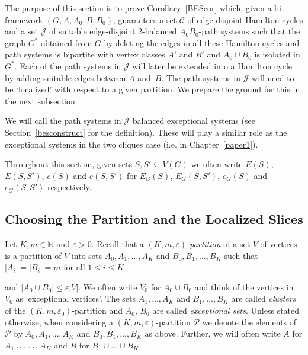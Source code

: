 \documentclass{memo-l}
\def\COMMENT#1{}
\def\cC{\mathcal{C}}
\def\eps{\varepsilon}
\def\cJ{\mathcal{J}}
\numberwithin{section}{chapter}
\numberwithin{equation}{section}
\numberwithin{firstthm}{section}
\numberwithin{figure}{section}
\begin{document}
{The purpose of this section is to prove Corollary~\ref{BEScor} which, given a bi-framework $(G,A,A_0,B,B_0)$,
guarantees a set $\cC$ of edge-disjoint Hamilton cycles and a set $\cJ$ of suitable edge-disjoint
$2$-balanced $A_0B_0$-path systems such that the graph $G^*$ obtained from $G$ by deleting the edges in
all these Hamilton cycles and path systems is bipartite with vertex classes $A'$ and $B'$ and
$A_0\cup B_0$ is isolated in $G^*$. Each of the path systems in $\cJ$ will later be extended into
a Hamilton cycle by adding suitable edges between $A$ and~$B$.
The path systems in $\cJ$ will need to be `localized' with respect to a given partition.
We prepare the ground for this in the next subsection.

We will call the path systems in $\cJ$ balanced exceptional systems (see Section~\ref{besconstruct} for the definition). These will play a similar role as the
exceptional systems in the two cliques case (i.e. in Chapter~\ref{paper1}).

Throughout this section, given sets $S,S'\subseteq V(G)$ we often write $E(S)$, $E(S,S')$, $e(S)$ and $e(S,S')$ for
$E_G(S)$, $E_G(S,S')$, $e_G(S)$ and $e_G(S,S')$ respectively.

\subsection{Choosing the Partition and the Localized Slices}\label{partition}  

Let $K,m\in\mathbb{N}$ and $\eps>0$.
Recall that a \emph{$(K,m,\eps)$-partition} of a set $V$ of vertices is a partition of $V$ into sets $A_0,A_1,\dots,A_K$
and $B_0,B_1,\dots,B_K$ such that $|A_i|=|B_i|=m$ for all $1 \le i \le K $%
\COMMENT{AL: replaced $i \ge 1$ with $1 \le i \le K $}
 and $|A_0\cup B_0|\le \eps |V|$.
We often write $V_0$ for $A_0\cup B_0$ and think of the vertices in $V_0$ as `exceptional vertices'.
The sets $A_1,\dots,A_K$ and $B_1,\dots,B_K$ are called \emph{clusters} of the $(K,m,\eps_0)$-partition
and $A_0$, $B_0$ are called \emph{exceptional sets}. Unless stated otherwise,
when considering a $(K,m,\eps)$-partition $\mathcal P$ we denote the elements
of $\mathcal P$ by $A_0,A_1,\dots,A_K$ and $B_0,B_1,\dots,B_K$ as above.
Further, we will often write $A$ for $A_1 \cup \dots \cup A_K$ and 
$B$ for $B_1 \cup \dots \cup B_K$.

}
\end{document}
